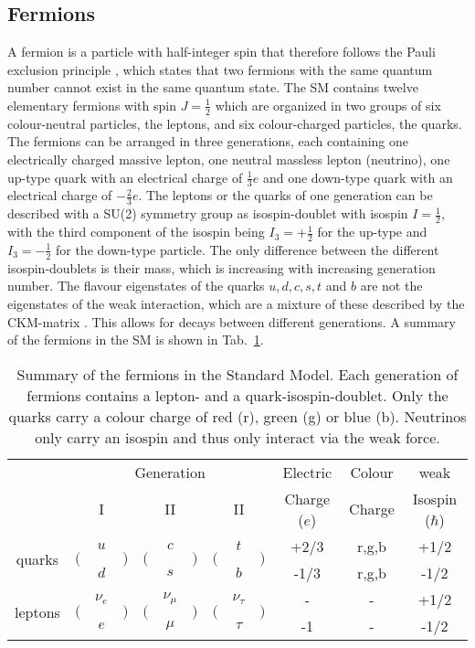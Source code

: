 \subsection{Fermions}
A fermion is a particle with half-integer spin that therefore follows the Pauli exclusion principle \cite{pauli}, which states that two fermions with the same quantum number cannot exist in the same quantum state. The SM contains twelve elementary fermions with spin $J=\frac{1}{2}$ which are organized in two groups of six colour-neutral particles, the leptons, and six colour-charged particles, the quarks. The fermions can be arranged in three generations, each containing one electrically charged massive lepton, one neutral massless lepton (neutrino), one up-type quark with an electrical charge of $\frac{1}{3}e$ and one down-type quark with an electrical charge of $-\frac{2}{3}e$. The leptons or the quarks of one generation can be described with a SU(2) symmetry group as isospin-doublet with isospin $I=\frac{1}{2}$, with the third component of the isospin being $I_3=+\frac{1}{2}$ for the up-type and $I_3=-\frac{1}{2}$ for the down-type particle. The only difference between the different isospin-doublets is their mass, which is increasing with increasing generation number. The flavour eigenstates of the quarks $u,d,c,s,t$ and $b$ are not the eigenstates of the weak interaction, which are a mixture of these described by the CKM-matrix \cite{CKM}. This allows for decays between different generations. 
A summary of the fermions in the SM is shown in Tab.~\ref{tab:theo:fermions}.\\
\begin{table}[]
	\centering
	\caption[Summary of the fermions in the Standard Model.]{Summary of the fermions in the Standard Model. Each generation of fermions contains a lepton- and a quark-isospin-doublet. Only the quarks carry a colour charge of red (r), green (g) or blue (b). Neutrinos only carry an isospin and thus only interact via the weak force.}
	\label{tab:theo:fermions}
	\begin{tabular}{crclrclrclccc}
	\hline
	& \multicolumn{9}{c}{Generation} & Electric & Colour &  weak \\
	& \multicolumn{3}{c}{I} & \multicolumn{3}{c}{II} & \multicolumn{3}{c}{II} & Charge ($e$) & Charge &  Isospin ($\hbar$) \\
	\hline
	\multirow{2}{*}{quarks} & \multirow{2}{*}{$\Big($} & $u$ & \multirow{2}{*}{$\Big)$} & \multirow{2}{*}{$\Big($} & $c$ & \multirow{2}{*}{$\Big)$} & \multirow{2}{*}{$\Big($} & $t$ & \multirow{2}{*}{$\Big)$} & +2/3 & r,g,b & +1/2 \\  
	 & & $d$ & & & $s$ & & & $b$ & & -1/3 & r,g,b & -1/2 \\ 
	\multirow{2}{*}{leptons}& \multirow{2}{*}{$\Big($} & $\nu_e$ & \multirow{2}{*}{$\Big)$} & \multirow{2}{*}{$\Big($} & $\nu_\mu$ & \multirow{2}{*}{$\Big)$} & \multirow{2}{*}{$\Big($} & $\nu_\tau$ & \multirow{2}{*}{$\Big)$} & - & - & +1/2 \\ 
	 & & $e$ & & & $\mu$ & & & $\tau$ & & -1 & - & -1/2 \\
	\hline
	\end{tabular}
\end{table}


